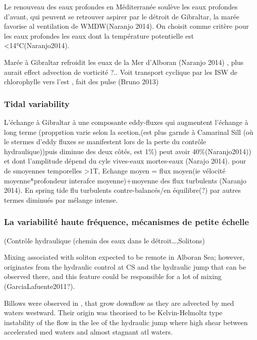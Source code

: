 Le renouveau des eaux profondes en Méditerranée soulève les eaux profondes d’avant, qui peuvent se retrouver aspirer par le détroit de Gibraltar, la marée favorise al ventilation de WMDW(Naranjo 2014). On choisit comme critère pour les eaux profondes les eaux dont la température potentielle est <14°C(Naranjo2014).

Marée à Gibraltar refroidit les euax de la Mer d’Alboran (Naranjo 2014) , plus aurait effect advection de vorticité ?.. Voit transport cyclique par les ISW de chlorophylle vers l’est , fait des pulse (Bruno 2013)


\subsubsection{Tidal variability}
L’échange à Gibraltar à une composante eddy-fluxes qui augmentent l’échange à long terme (propprtion varie selon la scetion,(est plus garnde à Camarinal Sill (où le stermes d’eddy fluxes se manifestent lors de la perte du contrôle hydraulique))puis diminue des deux côtés, est 1\%) peut avoir 40\%(Naranjo2014)) et dont l’amplitude dépend du cyle vives-eaux mortes-eaux (Narajo 2014). pour de smoyennes temporelles >1T, Echange moyen = flux moyen(ie vélocité moyenne*profondeur interafce moyenne)+moyenne des flux turbulents (Naranjo 2014). En spring tide flu turbulents contre-balancés/en équilibre(?) par autres termes diminués par mélange intense.





\subsubsection{La variabilité haute fréquence, mécanismes de petite échelle}
(Contrôle hydraulique (chemin des eaux dans le détroit…,Solitons)

Mixing associated with soliton expected to be remote in Alboran Sea; however, originates from the hydraulic control at CS and the hydraulic jump that can be observed there, and this feature could be responsible for a lot of mixing (GarciaLafuente2011?).

Billows were observed in \citet{WG94} , that grow downflow as they are advected by med waters westward. Their origin was theorised to be Kelvin-Helmoltz type instability of the flow in the lee of the hydraulic jump where high shear between accelerated med waters and almost stagnant atl waters.



